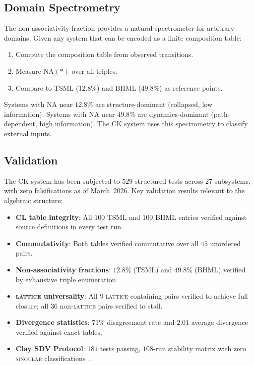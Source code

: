 \documentclass[11pt,a4paper]{article}
\theoremstyle{definition}
\theoremstyle{remark}
\newcommand{\NA}{\mathrm{NA}}
\newcommand{\TSML}{\mathrm{TSML}}
\newcommand{\BHML}{\mathrm{BHML}}
\begin{document}
\subsection{Domain Spectrometry}\label{sec:spectrometry}

The non-associativity fraction provides a natural spectrometer for arbitrary domains. Given any system that can be encoded as a finite composition table:
\begin{enumerate}[label=(\arabic*)]
\item Compute the composition table from observed transitions.
\item Measure $\NA(\ast)$ over all triples.
\item Compare to $\TSML$ ($12.8\%$) and $\BHML$ ($49.8\%$) as reference points.
\end{enumerate}

Systems with $\NA$ near $12.8\%$ are structure-dominant (collapsed, low information). Systems with $\NA$ near $49.8\%$ are dynamics-dominant (path-dependent, high information). The CK system uses this spectrometry to classify external inputs.

\subsection{Validation}\label{sec:validation}

The CK system has been subjected to $529$ structured tests across $27$ subsystems, with zero falsifications as of March~2026. Key validation results relevant to the algebraic structure:
\begin{itemize}
\item \textbf{CL table integrity}: All $100$ $\TSML$ and $100$ $\BHML$ entries verified against source definitions in every test run.
\item \textbf{Commutativity}: Both tables verified commutative over all $45$ unordered pairs.
\item \textbf{Non-associativity fractions}: $12.8\%$ ($\TSML$) and $49.8\%$ ($\BHML$) verified by exhaustive triple enumeration.
\item \textbf{\textsc{lattice} universality}: All $9$ \textsc{lattice}-containing pairs verified to achieve full closure; all $36$ non-\textsc{lattice} pairs verified to stall.
\item \textbf{Divergence statistics}: $71\%$ disagreement rate and $2.01$ average divergence verified against exact tables.
\item \textbf{Clay SDV Protocol}: $181$ tests passing, $108$-run stability matrix with zero \textsc{singular} classifications~\cite{Sanders2026d}.
\end{itemize}
\end{document}
